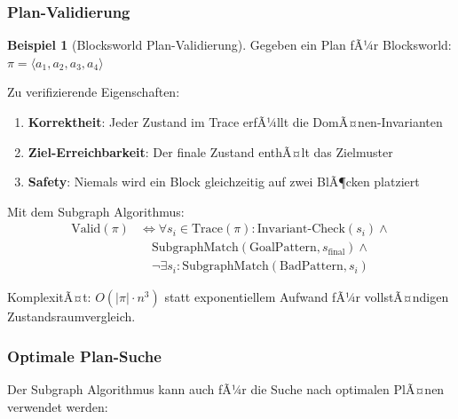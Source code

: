 ﻿\documentclass[a4paper,12pt]{article}
\theoremstyle{definition}
\newtheorem{beispiel}{Beispiel}[section]
\begin{document}
\subsubsection{Plan-Validierung}

\begin{beispiel}[Blocksworld Plan-Validierung]
	Gegeben ein Plan fÃ¼r Blocksworld: $\pi = \langle a_1, a_2, a_3, a_4 \rangle$
	
	Zu verifizierende Eigenschaften:
	\begin{enumerate}
		\item \textbf{Korrektheit}: Jeder Zustand im Trace erfÃ¼llt die DomÃ¤nen-Invarianten
		\item \textbf{Ziel-Erreichbarkeit}: Der finale Zustand enthÃ¤lt das Zielmuster
		\item \textbf{Safety}: Niemals wird ein Block gleichzeitig auf zwei BlÃ¶cken platziert
	\end{enumerate}
	
	Mit dem Subgraph Algorithmus:
	\begin{align}
	\text{Valid}(\pi) &\iff \forall s_i \in \text{Trace}(\pi): \text{Invariant-Check}(s_i) \land \\
	&\quad \text{SubgraphMatch}(\text{GoalPattern}, s_{\text{final}}) \land \\
	&\quad \neg\exists s_i: \text{SubgraphMatch}(\text{BadPattern}, s_i)
	\end{align}
	
	KomplexitÃ¤t: $O(|\pi| \cdot n^3)$ statt exponentiellem Aufwand fÃ¼r vollstÃ¤ndigen Zustandsraumvergleich.
\end{beispiel}

\subsubsection{Optimale Plan-Suche}

Der Subgraph Algorithmus kann auch fÃ¼r die Suche nach optimalen PlÃ¤nen verwendet werden:
\end{document}
